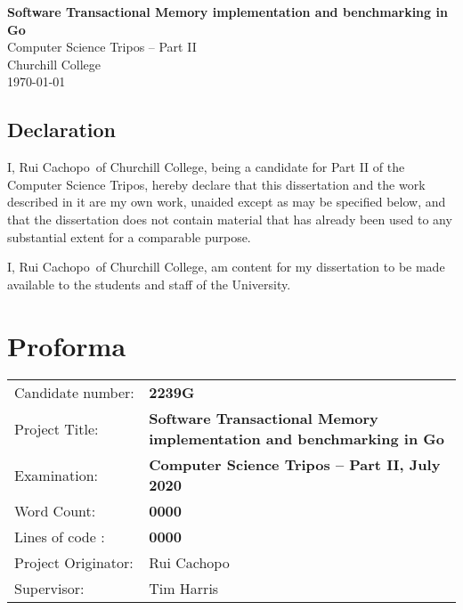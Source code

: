 \documentclass[12pt,a4paper,oneside,openright]{report}
\newcommand{\disstitle}{Software Transactional Memory implementation
  and benchmarking in Go}
\newcommand{\college}{Churchill College}
\newcommand{\studentname}{Rui Cachopo}
\newcommand{\candidatenumber}{2239G}
\newcommand{\wordcount}{0000}
\newcommand{\loc}{0000}
\newcommand{\originator}{Rui Cachopo}
\newcommand{\supervisor}{Tim Harris}
\begin{document}


\pagestyle{empty}


\rightline{\LARGE \textbf{\studentname}}

\vspace*{60mm}
\begin{center}
  \Huge
  \textbf{\disstitle} \\[5mm]
  Computer Science Tripos -- Part II \\[5mm]
  \college \\[5mm]
  \today
\end{center}

\newpage

\section*{Declaration}

I, \studentname\ of \college, being a candidate for Part II of the
Computer Science Tripos, hereby declare that this dissertation and the
work described in it are my own work, unaided except as may be
specified below, and that the dissertation does not contain material
that has already been used to any substantial extent for a comparable
purpose.

I, \studentname\ of \college, am content for my dissertation to be
made available to the students and staff of the University.

\bigskip {}

\medskip {}

\chapter*{Proforma}

\thispagestyle{empty}

{\large
  \begin{tabular}{L{0.3\linewidth} L{0.7\linewidth}}
    Candidate number: & \bf \candidatenumber                      \\
    Project Title:      & \bf \disstitle \\
    Examination:        & \bf Computer Science Tripos -- Part II, July 2020  \\
    Word Count:         & \bf \wordcount  \\
    Lines of code : & \bf \loc \\
    Project Originator: & \originator \\
    Supervisor: & \supervisor \\
  \end{tabular}
}
\end{document}
